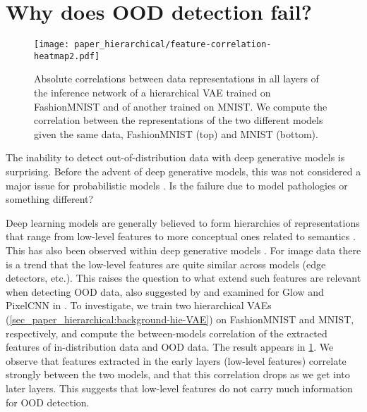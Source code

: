 {\section{Why does OOD detection fail?}\label{sec_paper_hierarchical:why-does-ood-fail}
\begin{figure}[t]
    \centering
    \texttt{[image: paper\_hierarchical/feature-correlation-heatmap2.pdf]}
    \vspace{0mm}
    \caption[Absolute correlations between data representations in all layers of the inference network of a hierarchical VAE trained on FashionMNIST and of another trained on MNIST.]{
    Absolute correlations between data representations in all layers of the inference network of a hierarchical VAE trained on FashionMNIST and of another trained on MNIST.
    We compute the correlation between the representations of the two different models given the same data, FashionMNIST (top) and MNIST (bottom).
    }
    \vspace{0mm}
    \label{fig_hierarchical:correlations-heatmap}
\end{figure}

The inability to detect out-of-distribution data with deep generative models is surprising.
Before the advent of deep generative models, this was not considered a major issue for probabilistic models \cite{bishop_novelty_1994}.
Is the failure due to model pathologies or something different?

Deep learning models are generally believed to form hierarchies of representations that range from low-level features to more conceptual ones related to semantics \cite{bengio_representation_2013}.
This has also been observed within deep generative models \cite{maaloe_biva_2019, child_very_2021}.
For image data there is a trend that the low-level features are quite similar across models (edge detectors, etc.). This raises the question to what extend such features are relevant when detecting OOD data, also suggested  by \cite{nalisnick_deep_2019} and examined for Glow and PixelCNN in \cite{schirrmeister_understanding_2020}.
To investigate, we train two hierarchical VAEs (\cref{sec_paper_hierarchical:background-hie-VAE}) on FashionMNIST and MNIST, respectively, and compute the between-models correlation of the extracted features of in-distribution data and OOD data.
The result appears in \cref{fig_hierarchical:correlations-heatmap}.
We observe that features extracted in the early layers (low-level features) correlate strongly between the two models, and that this correlation drops as we get into later layers.
This suggests that low-level features do not carry much information for OOD detection.

}
